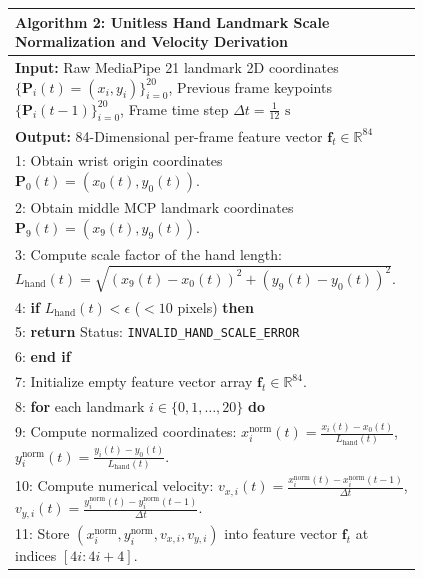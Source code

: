 \begin{figure}[htbp]
\centering
\begin{minipage}{0.92\textwidth}
\small
\setlength{\extrarowheight}{2pt}
\begin{tabular}{|p{0.96\linewidth}|}
\hline
\textbf{Algorithm 2: Unitless Hand Landmark Scale Normalization and Velocity Derivation} \\
\hline
{\small\sffamily \textbf{Input:} Raw MediaPipe 21 landmark 2D coordinates $\{\mathbf{P}_i(t) = (x_i, y_i)\}_{i=0}^{20}$, Previous frame keypoints $\{\mathbf{P}_i(t-1)\}_{i=0}^{20}$, Frame time step $\Delta t = \frac{1}{12}\text{ s}$} \\
{\small\sffamily \textbf{Output:} 84-Dimensional per-frame feature vector $\mathbf{f}_t \in \mathbb{R}^{84}$} \\
{\small 1: Obtain wrist origin coordinates $\mathbf{P}_0(t) = (x_0(t), y_0(t))$.} \\
{\small 2: Obtain middle MCP landmark coordinates $\mathbf{P}_9(t) = (x_9(t), y_9(t))$.} \\
{\small 3: Compute scale factor of the hand length: $L_{\text{hand}}(t) = \sqrt{(x_9(t) - x_0(t))^2 + (y_9(t) - y_0(t))^2}$.} \\
{\small 4: \textbf{if} $L_{\text{hand}}(t) < \epsilon$ ($< 10$ pixels) \textbf{then}} \\
{\small 5: \hspace{1em} \textbf{return} Status: \texttt{INVALID\_HAND\_SCALE\_ERROR}} \\
{\small 6: \textbf{end if}} \\
{\small 7: Initialize empty feature vector array $\mathbf{f}_t \in \mathbb{R}^{84}$.} \\
{\small 8: \textbf{for} each landmark $i \in \{0, 1, \dots, 20\}$ \textbf{do}} \\
{\small 9: \hspace{1em} Compute normalized coordinates: $x_i^{\text{norm}}(t) = \frac{x_i(t) - x_0(t)}{L_{\text{hand}}(t)}$, \hspace{1em} $y_i^{\text{norm}}(t) = \frac{y_i(t) - y_0(t)}{L_{\text{hand}}(t)}$.} \\
{\small 10: \hspace{1em} Compute numerical velocity: $v_{x,i}(t) = \frac{x_i^{\text{norm}}(t) - x_i^{\text{norm}}(t-1)}{\Delta t}$, \hspace{1em} $v_{y,i}(t) = \frac{y_i^{\text{norm}}(t) - y_i^{\text{norm}}(t-1)}{\Delta t}$.} \\
{\small 11: \hspace{1em} Store $(x_i^{\text{norm}}, y_i^{\text{norm}}, v_{x,i}, v_{y,i})$ into feature vector $\mathbf{f}_t$ at indices $[4i : 4i+4]$.} \\

\end{tabular}
\end{minipage}
\end{figure}
